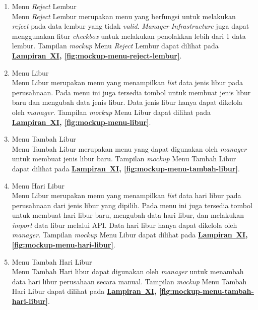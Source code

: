 \begin{enumerate}
    \item Menu \textit{Reject} Lembur
    \\ Menu \textit{Reject} Lembur merupakan menu yang berfungsi untuk melakukan \textit{reject} pada data lembur yang tidak \textit{valid}. \textit{Manager Infrastructure} juga dapat menggunakan fitur \textit{checkbox} untuk melakukan penolakkan lebih dari 1 data lembur. Tampilan \textit{mockup} Menu \textit{Reject} Lembur dapat dilihat pada \textbf{\hyperref[sec:mockup-aplikasi-presensi-online]{Lampiran~XI}, \ref{fig:mockup-menu-reject-lembur}}.

    \item Menu Libur
    \\ Menu Libur merupakan menu yang menampilkan \textit{list} data jenis libur pada perusahnaan. Pada menu ini juga tersedia tombol untuk membuat jenis libur baru dan mengubah data jenis libur. Data jenis libur hanya dapat dikelola oleh \textit{manager}. Tampilan \textit{mockup} Menu Libur dapat dilihat pada \textbf{\hyperref[sec:mockup-aplikasi-presensi-online]{Lampiran~XI}, \ref{fig:mockup-menu-libur}}.

    \item Menu Tambah Libur
    \\ Menu Tambah Libur merupakan menu yang dapat digunakan oleh \textit{manager} untuk membuat jenis libur baru. Tampilan \textit{mockup} Menu Tambah Libur dapat dilihat pada \textbf{\hyperref[sec:mockup-aplikasi-presensi-online]{Lampiran~XI}, \ref{fig:mockup-menu-tambah-libur}}.
    
    \item Menu Hari Libur
    \\ Menu Libur merupakan menu yang menampilkan \textit{list} data hari libur pada perusahnaan dari jenis libur yang dipilih. Pada menu ini juga tersedia tombol untuk membuat hari libur baru, mengubah data hari libur, dan melakukan \textit{import} data libur melalui API. Data hari libur hanya dapat dikelola oleh \textit{manager}. Tampilan \textit{mockup} Menu Libur dapat dilihat pada \textbf{\hyperref[sec:mockup-aplikasi-presensi-online]{Lampiran~XI}, \ref{fig:mockup-menu-hari-libur}}.

    \item Menu Tambah Hari Libur
    \\ Menu Tambah Hari libur dapat digunakan oleh \textit{manager} untuk menambah data hari libur perusahaan secara manual. Tampilan \textit{mockup} Menu Tambah Hari Libur dapat dilihat pada \textbf{\hyperref[sec:mockup-aplikasi-presensi-online]{Lampiran~XI}, \ref{fig:mockup-menu-tambah-hari-libur}}.


\end{enumerate}

